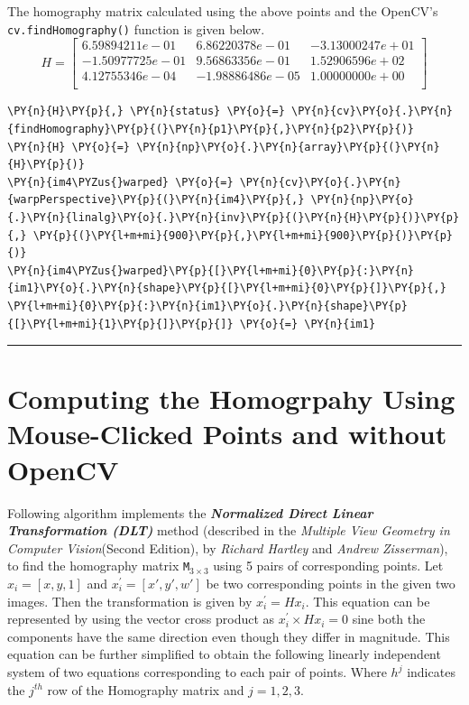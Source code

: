 \documentclass[a4paper,11pt]{article}%
\begin{document}
The homography matrix calculated using the above points and the OpenCV's {\tt cv.findHomography()} function is given below. 
{\scriptsize
\[
H = 
\begin{bmatrix}
 6.59894211e-01 &  6.86220378e-01& -3.13000247e+01\\
-1.50977725e-01  &9.56863356e-01  &1.52906596e+02\\
 4.12755346e-04& -1.98886486e-05  &1.00000000e+00\\
\end{bmatrix}
\]
}

    \begin{tcolorbox}[breakable, size=fbox, boxrule=1pt, pad at break*=1mm,colback=cellbackground, colframe=cellborder]
\begin{Verbatim}[commandchars=\\\{\}]
\PY{n}{H}\PY{p}{,} \PY{n}{status} \PY{o}{=} \PY{n}{cv}\PY{o}{.}\PY{n}{findHomography}\PY{p}{(}\PY{n}{p1}\PY{p}{,}\PY{n}{p2}\PY{p}{)}
\PY{n}{H} \PY{o}{=} \PY{n}{np}\PY{o}{.}\PY{n}{array}\PY{p}{(}\PY{n}{H}\PY{p}{)}
\PY{n}{im4\PYZus{}warped} \PY{o}{=} \PY{n}{cv}\PY{o}{.}\PY{n}{warpPerspective}\PY{p}{(}\PY{n}{im4}\PY{p}{,} \PY{n}{np}\PY{o}{.}\PY{n}{linalg}\PY{o}{.}\PY{n}{inv}\PY{p}{(}\PY{n}{H}\PY{p}{)}\PY{p}{,} \PY{p}{(}\PY{l+m+mi}{900}\PY{p}{,}\PY{l+m+mi}{900}\PY{p}{)}\PY{p}{)}
\PY{n}{im4\PYZus{}warped}\PY{p}{[}\PY{l+m+mi}{0}\PY{p}{:}\PY{n}{im1}\PY{o}{.}\PY{n}{shape}\PY{p}{[}\PY{l+m+mi}{0}\PY{p}{]}\PY{p}{,} \PY{l+m+mi}{0}\PY{p}{:}\PY{n}{im1}\PY{o}{.}\PY{n}{shape}\PY{p}{[}\PY{l+m+mi}{1}\PY{p}{]}\PY{p}{]} \PY{o}{=} \PY{n}{im1}
\end{Verbatim}
\end{tcolorbox}
\vspace{0.5cm}
\hrule

\section{Computing the Homogrpahy Using Mouse-Clicked Points and without OpenCV}

Following algorithm implements the \textbf{\textit{Normalized Direct Linear Transformation (DLT)}} method (described in the \textit{Multiple View Geometry in Computer Vision}(Second Edition), by \textit{Richard Hartley} and   \textit{Andrew Zisserman}), to find the homography matrix {\tt M}$_{3 \times 3}$ using 5 pairs of corresponding points. Let $x_i = [x , y, 1]$ and $x_i^\prime = [x\prime , y\prime, w\prime ] $  be two corresponding points in the given two images. Then the transformation is given by $x_i^\prime = Hx_i$. This equation can be represented by using the vector cross product as  $x_i^\prime \times Hx_i = 0$ sine both the components have the same direction even though they differ in magnitude. This equation can be further simplified  to obtain the following linearly independent  system of two equations corresponding to each pair of points. Where $h^j$ indicates the $j^{th}$ row of the Homography matrix and $j = {1,2,3}$.
\end{document}
